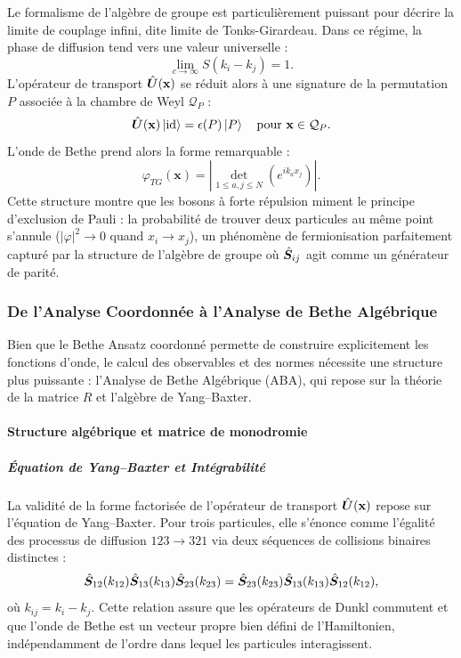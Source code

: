 Le formalisme de l'algèbre de groupe est particulièrement puissant pour décrire la limite de couplage infini, dite limite de Tonks-Girardeau. Dans ce régime, la phase de diffusion tend vers une valeur universelle :
\begin{equation}
    \lim_{c \to \infty} S(k_i - k_j) = 1.
\end{equation}
L'opérateur de transport $\hat{\bm{U}}(\mathbf{x})$ se réduit alors à une signature de la permutation $P$ associée à la chambre de Weyl $\mathcal{Q}_P$ :
\begin{equation}
    \hat{\bm{U}}(\mathbf{x}) \ket{\text{id}} = \epsilon(P) \ket{P} \quad \text{pour } \mathbf{x} \in \mathcal{Q}_P.
\end{equation}
L'onde de Bethe prend alors la forme remarquable :
\begin{equation}
    \varphi_{TG}(\mathbf{x}) = \left| \det_{1 \leq a,j \leq N} \left( e^{i k_a x_j} \right) \right|.
\end{equation}
Cette structure montre que les bosons à forte répulsion miment le principe d'exclusion de Pauli : la probabilité de trouver deux particules au même point s'annule ($|\varphi|^2 \to 0$ quand $x_i \to x_j$), un phénomène de fermionisation parfaitement capturé par la structure de l'algèbre de groupe où $\hat{\bm{S}}_{ij}$ agit comme un générateur de parité.


\subsubsection{De l'Analyse Coordonnée à l'Analyse de Bethe Algébrique}

Bien que le Bethe Ansatz coordonné permette de construire explicitement les fonctions d'onde, le calcul des observables et des normes nécessite une structure plus puissante : l'Analyse de Bethe Algébrique (ABA), qui repose sur la théorie de la matrice $R$ et l'algèbre de Yang--Baxter.

\paragraph{Structure algébrique et matrice de monodromie}

\subparagraph{Équation de Yang--Baxter et Intégrabilité}

La validité de la forme factorisée de l'opérateur de transport $\hat{\bm{U}}(\mathbf{x})$ repose sur l'équation de Yang--Baxter. Pour trois particules, elle s'énonce comme l'égalité des processus de diffusion $123 \to 321$ via deux séquences de collisions binaires distinctes :
\begin{equation}
    \hat{\bm{S}}_{12}(k_{12}) \hat{\bm{S}}_{13}(k_{13}) \hat{\bm{S}}_{23}(k_{23}) = \hat{\bm{S}}_{23}(k_{23}) \hat{\bm{S}}_{13}(k_{13}) \hat{\bm{S}}_{12}(k_{12}),
\end{equation}
où $k_{ij} = k_i - k_j$. Cette relation assure que les opérateurs de Dunkl commutent et que l'onde de Bethe est un vecteur propre bien défini de l'Hamiltonien, indépendamment de l'ordre dans lequel les particules interagissent.


